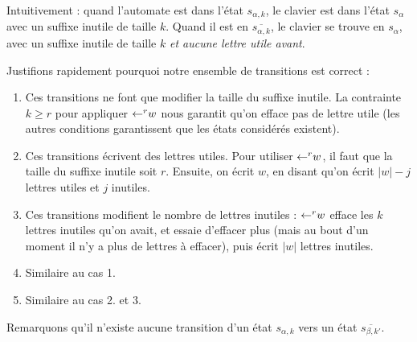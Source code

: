 \documentclass[12pt, a4paper]{article}
\renewcommand{\bar}{\overline}
\begin{document}
    Intuitivement : quand l'automate est dans l'état $s_{\alpha,k}$, le clavier est dans l'état $s_\alpha$ avec un suffixe inutile de taille $k$. Quand il est en $\overline{s_{\alpha,k}}$, le clavier se trouve en $s_\alpha$, avec un suffixe inutile de taille $k$ \emph{et aucune lettre utile avant}. 
    
    Justifions rapidement pourquoi notre ensemble de transitions est correct :
    \begin{enumerate}
        \item Ces transitions ne font que modifier la taille du suffixe inutile. La contrainte $k \geqslant r$ pour appliquer $\mathord{\leftarrow}^r w$ nous garantit qu'on efface pas de lettre utile (les autres conditions garantissent que les états considérés existent).
        \item Ces transitions écrivent des lettres utiles. Pour utiliser $\mathord{\leftarrow}^r w$, il faut que la taille du suffixe inutile soit $r$. Ensuite, on écrit $w$, en disant qu'on écrit $|w|-j$ lettres utiles et $j$ inutiles.
        \item Ces transitions modifient le nombre de lettres inutiles : $\mathord{\leftarrow}^r w$ efface les $k$ lettres inutiles qu'on avait, et essaie d'effacer plus (mais au bout d'un moment il n'y a plus de lettres à effacer), puis écrit $|w|$ lettres inutiles.
        \item Similaire au cas 1.
        \item Similaire au cas 2. et 3.
    \end{enumerate}
    Remarquons qu'il n'existe aucune transition d'un état $s_{\alpha, k}$ vers un état $\bar{s_{\beta, k'}}$.
\end{document}
